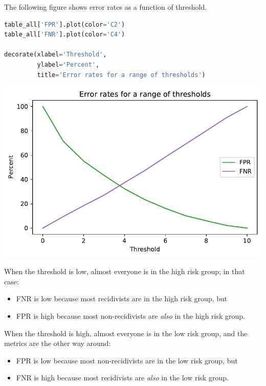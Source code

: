 The following figure shows error rates as a function of threshold.

\begin{lstlisting}[language=Python,style=source]
table_all['FPR'].plot(color='C2')
table_all['FNR'].plot(color='C4')

decorate(xlabel='Threshold', 
         ylabel='Percent',
         title='Error rates for a range of thresholds')
\end{lstlisting}

\begin{center}
\includegraphics[scale=0.75]{02_calibration_files/02_calibration_37_0.pdf}
\end{center}

When the threshold is low, almost everyone is in the high risk group; in
that case:

\begin{itemize}
\item
  FNR is low because most recidivists are in the high risk group, but
\item
  FPR is high because most non-recidivists are \emph{also} in the high
  risk group.
\end{itemize}

When the threshold is high, almost everyone is in the low risk group,
and the metrics are the other way around:

\begin{itemize}
\item
  FPR is low because most non-recidivists are in the low risk group, but
\item
  FNR is high because most recidivists are \emph{also} in the low risk
  group.
\end{itemize}

